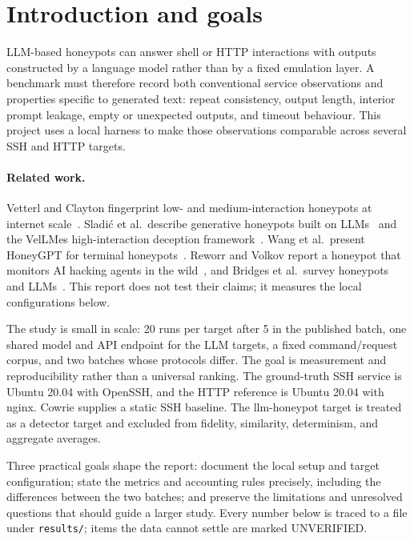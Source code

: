 \documentclass[a4paper,11pt]{article}
\begin{document}
\section{Introduction and goals}

LLM-based honeypots can answer shell or HTTP interactions with outputs
constructed by a language model rather than by a fixed emulation layer. A
benchmark must therefore record both conventional service observations and
properties specific to generated text: repeat consistency, output length,
interior prompt leakage, empty or unexpected outputs, and timeout behaviour.
This project uses a local harness to make those observations comparable across
several SSH and HTTP targets.

\paragraph{Related work.} Vetterl and Clayton fingerprint low- and
medium-interaction honeypots at internet scale~\cite{bitterharvest}. Sladi\'c
et al.\ describe generative honeypots built on LLMs~\cite{llmintheshell} and
the VelLMes high-interaction deception framework~\cite{vellmes-paper}. Wang et
al.\ present HoneyGPT for terminal honeypots~\cite{honeygpt}. Reworr and Volkov
report a honeypot that monitors AI hacking agents in the wild~\cite{reworr},
and Bridges et al.\ survey honeypots and LLMs~\cite{bridgessok}. This report
does not test their claims; it measures the local configurations below.

The study is small in scale: 20 runs per target after 5 in the published batch,
one shared model and API endpoint for the LLM targets, a fixed command/request
corpus, and two batches whose protocols differ. The goal is measurement and reproducibility rather than a
universal ranking. The ground-truth SSH service is Ubuntu 20.04 with OpenSSH,
and the HTTP reference is Ubuntu 20.04 with nginx. Cowrie supplies a static SSH
baseline. The llm-honeypot target is treated as a detector target and excluded
from fidelity, similarity, determinism, and aggregate averages.

Three practical goals shape the report: document the local setup and target
configuration; state the metrics and accounting rules precisely, including the
differences between the two batches; and preserve the limitations and
unresolved questions that should guide a larger study. Every number below is
traced to a file under \texttt{results/}; items the data cannot settle are
marked UNVERIFIED.
\end{document}
